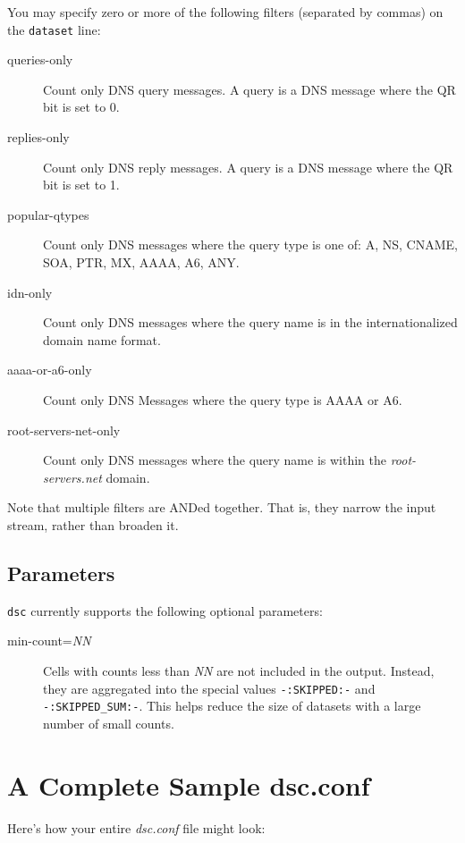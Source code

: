 \documentclass{report}
\begin{document}
You may specify zero or more of the following filters (separated by commas) on
the {\tt dataset\/} line:

\begin{description}
\item[queries-only]
	Count only DNS query messages.  A query is a DNS message
	where the QR bit is set to 0.
\item[replies-only]
	Count only DNS reply messages.  A query is a DNS message 
        where the QR bit is set to 1.
\item[popular-qtypes]
	Count only DNS messages where the query type is one of:
	A, NS, CNAME, SOA, PTR, MX, AAAA, A6, ANY.
\item[idn-only]
	Count only DNS messages where the query name is in the
	internationalized domain name format.
\item[aaaa-or-a6-only]
	Count only DNS Messages where the query type is AAAA or A6.
\item[root-servers-net-only]
	Count only DNS messages where the query name is within
	the {\em root-servers.net\/} domain.
\end{description}

\noindent
Note that multiple filters are ANDed together.  That is, they
narrow the input stream, rather than broaden it.

\subsection{Parameters}

\noindent
{\tt dsc\/} currently supports the following optional parameters:

\begin{description}
\item[min-count={\em NN\/}]
	Cells with counts less than {\em NN\/} are not included
	in the output.  Instead, they are aggregated into the special
	values {\tt -:SKIPPED:-\/} and {\tt -:SKIPPED\_SUM:-\/}.  This helps reduce
	the size of datasets with a large number of small counts.
\end{description}

\section{A Complete Sample dsc.conf}

Here's how your entire {\em dsc.conf\/} file might look:

\noindent\hrulefill
\end{document}
